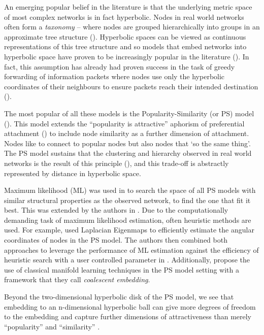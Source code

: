 \documentclass{IEEEtran}
\begin{document}
	An emerging popular belief in the literature is that the underlying metric space of most complex networks is in fact hyperbolic. Nodes in real world networks often form a \textit{taxonomy} -- where nodes are grouped hierarchically into groups in an approximate tree structure (\cite{papadopoulos2011popularity}). 
	Hyperbolic spaces can be viewed as continuous representations of this tree structure and so models that embed networks into hyperbolic space have proven to be increasingly popular in the literature (\cite{krioukov2009curvature,krioukov2010hyperbolic}). In fact, this assumption has already had proven success in the task of greedy forwarding of information packets where nodes use only the hyperbolic coordinates of their neighbours to ensure packets reach their intended destination (\cite{papadopoulos2010greedy}). 
	
	The most popular of all these models is the Popularity-Similarity (or PS) model (\cite{papadopoulos2011popularity}). This model extends the ``popularity is attractive'' aphorism of preferential attachment (\cite{barabasi1999emergence}) to include node similarity as a further dimension of attachment. Nodes like to connect to popular nodes but also nodes that `so the same thing'. The PS model sustains that the clustering and hierarchy observed in real world networks is the result of this principle (\cite{alanis2016efficient}), and this trade-off is abstractly represented by distance in hyperbolic space. 
	
	Maximum likelihood (ML) was used in \cite{papadopoulos2011popularity} to search the space of all PS models with similar structural properties as the observed network, to find the one that fit it best. This was extended by the authors in \cite{papadopoulos2015network,papadopoulos2015networkgeo}. Due to the computationally demanding task of maximum likelihood estimation, often heuristic methods are used. For example, \cite{alanis2016efficient} used Laplacian Eigenmaps to efficiently estimate the angular coordinates of nodes in the PS model. The authors then combined both approaches to leverage the performance of ML estimation against the efficiency of heuristic search with a user controlled parameter in \cite{alanis2016manifold}. Additionally, \cite{thomas2016machine} propose the use of classical manifold learning techniques in the PS model setting with a framework that they call \textit{coalescent embedding}. 
	
	Beyond the two-dimensional hyperbolic disk of the PS model, we see that embedding to an n-dimensional hyperbolic ball can give more degrees of freedom to the embedding and capture further dimensions of attractiveness than merely ``popularity'' and ``similarity'' \cite{nickel2017poincar}.
	
\end{document}
